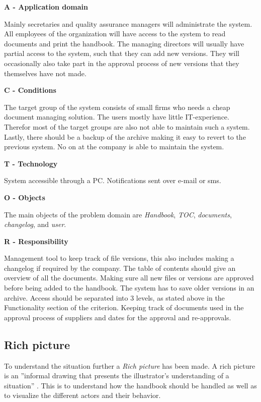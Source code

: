 \textbf{A - Application domain}

Mainly secretaries and quality assurance managers will administrate the system.
All employees of the organization will have access to the system to read documents and print the handbook.
The managing directors will usually have partial access to the system, such that they can add new versions.
They will occasionally also take part in the approval process of new versions that they themselves have not made.

\textbf{C - Conditions}

The target group of the system consists of small firms who needs a cheap document managing solution.
The users mostly have little IT-experience.
Therefor most of the target groups are also not able to maintain such a system.
Lastly, there should be a backup of the archive making it easy to revert to the previous system.
No on at the company is able to maintain the system.

\textbf{T - Technology}

System accessible through a PC.
Notifications sent over e-mail or sms.

\textbf{O - Objects}

The main objects of the problem domain are \textit{Handbook}, \textit{TOC}, \textit{documents}, \textit{changelog}, and \textit{user}.

\textbf{R  - Responsibility}

Management tool to keep track of file versions, this also includes making a changelog if required by the company.
The table of contents should give an overview of all the documents.
Making sure all new files or versions are approved before being added to the handbook.
The system has to save older versions in an archive.
Access should be separated into 3 levels, as stated above in the Functionality section of the criterion.
Keeping track of documents used in the approval process of suppliers and dates for the approval and re-approvals.

\subsection{Rich picture} \label{sec:richpictures}

To understand the situation further a \textit{Rich picture} has been made. A rich picture is an ''informal drawing that presents the illustrator's understanding of a situation'' \citep[~p. 26]{Rod-Aalborg}.
This is to understand how the handbook should be handled as well as to visualize the different actors and their behavior.


